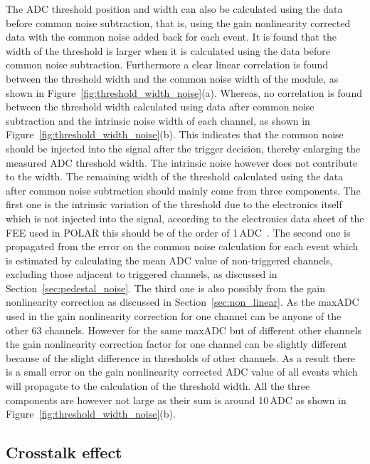 \documentclass[preprint,sort&compress,12pt]{elsarticle}
\begin{document}
The ADC threshold position and width can also be calculated using the data before common noise subtraction, that is, using the gain nonlinearity corrected data with the common noise added back for each event. It is found that the width of the threshold is larger when it is calculated using the data before common noise subtraction. Furthermore a clear linear correlation is found between the threshold width and the common noise width of the module, as shown in Figure~\ref{fig:threshold_width_noise}(a). Whereas, no correlation is found between the threshold width calculated using data after common noise subtraction and the intrinsic noise width of each channel, as shown in Figure~\ref{fig:threshold_width_noise}(b). This indicates that the common noise should be injected into the signal after the trigger decision, thereby enlarging the measured ADC threshold width. The intrinsic noise however does not contribute to the width. The remaining width of the threshold calculated using the data after common noise subtraction should mainly come from three components. The first one is the intrinsic variation of the threshold due to the electronics itself which is not injected into the signal, according to the electronics data sheet of the FEE used in POLAR this should be of the order of 1\,ADC~\cite{IDEAS}. The second one is propagated from the error on the common noise calculation for each event which is estimated by calculating the mean ADC value of non-triggered channels, excluding those adjacent to triggered channels, as discussed in Section~\ref{sec:pedestal_noise}. The third one is also possibly from the gain nonlinearity correction as discussed in Section~\ref{sec:non_linear}. As the maxADC used in the gain nonlinearity correction for one channel can be anyone of the other 63 channels. However for the same maxADC but of different other channels the gain nonlinearity correction factor for one channel can be slightly different because of the slight difference in thresholds of other channels. As a result there is a small error on the gain nonlinearity corrected ADC value of all events which will propagate to the calculation of the threshold width. All the three components are however not large as their sum is around 10\,ADC as shown in Figure~\ref{fig:threshold_width_noise}(b).

\subsection{Crosstalk effect}\label{sec:crosstalk}
\end{document}
